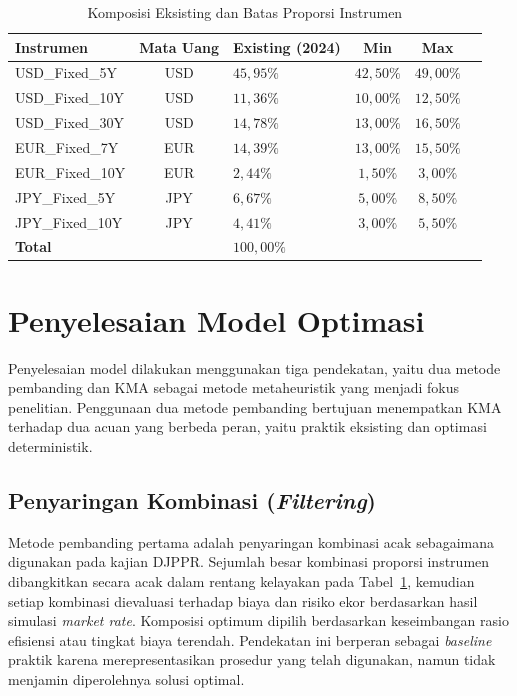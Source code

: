 \begin{table}[H]
    \centering
    \caption{Komposisi Eksisting dan Batas Proporsi Instrumen}
    \label{tab:batas-bobot}
    \begin{tabularx}{\textwidth}{l c X c c c}
    \hline
    \textbf{Instrumen} & \textbf{Mata Uang} & \textbf{Existing (2024)} &
    \textbf{Min} & \textbf{Max} \\
    \hline
    USD\_Fixed\_5Y  & USD & $45{,}95\%$ & $42{,}50\%$ & $49{,}00\%$ \\
    USD\_Fixed\_10Y & USD & $11{,}36\%$ & $10{,}00\%$ & $12{,}50\%$ \\
    USD\_Fixed\_30Y & USD & $14{,}78\%$ & $13{,}00\%$ & $16{,}50\%$ \\
    EUR\_Fixed\_7Y  & EUR & $14{,}39\%$ & $13{,}00\%$ & $15{,}50\%$ \\
    EUR\_Fixed\_10Y & EUR & $2{,}44\%$  & $1{,}50\%$  & $3{,}00\%$ \\
    JPY\_Fixed\_5Y  & JPY & $6{,}67\%$  & $5{,}00\%$  & $8{,}50\%$ \\
    JPY\_Fixed\_10Y & JPY & $4{,}41\%$  & $3{,}00\%$  & $5{,}50\%$ \\
    \hline
    \textbf{Total}  &     & $100{,}00\%$ & & \\
    \hline
    \end{tabularx}
\end{table}


\section{Penyelesaian Model Optimasi}\label{sec:penyelesaian-model}
Penyelesaian model dilakukan menggunakan tiga pendekatan, yaitu dua metode pembanding dan KMA sebagai metode metaheuristik yang menjadi fokus penelitian. Penggunaan dua metode pembanding bertujuan menempatkan KMA terhadap dua acuan yang berbeda peran, yaitu praktik eksisting dan optimasi deterministik.


    \subsection{Penyaringan Kombinasi (\textit{Filtering})}\label{sub:filtering}

    Metode pembanding pertama adalah penyaringan kombinasi acak sebagaimana digunakan pada kajian DJPPR. Sejumlah besar kombinasi proporsi instrumen dibangkitkan secara acak dalam rentang kelayakan pada Tabel~\ref{tab:batas-bobot}, kemudian setiap kombinasi dievaluasi terhadap biaya dan risiko ekor berdasarkan hasil simulasi \textit{market rate}. Komposisi optimum dipilih berdasarkan keseimbangan rasio efisiensi atau tingkat biaya terendah. Pendekatan ini berperan sebagai \textit{baseline} praktik karena merepresentasikan prosedur yang telah digunakan, namun tidak menjamin diperolehnya solusi optimal.

